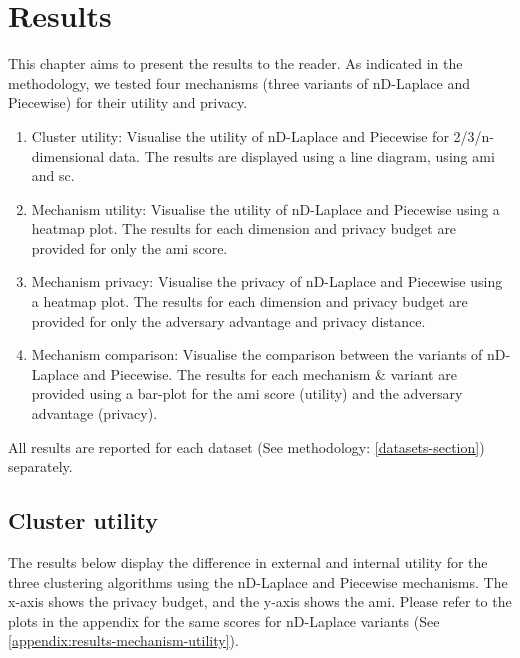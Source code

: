 \chapter{Results}
This chapter aims to present the results to the reader.
As indicated in the methodology, we tested four mechanisms (three variants of nD-Laplace and Piecewise) for their utility and privacy.
\begin{enumerate}
  \item Cluster utility: Visualise the utility of nD-Laplace and Piecewise for 2/3/n-dimensional data.
        The results are displayed using a line diagram, using \gls{ami} and \gls{sc}.
  \item Mechanism utility: Visualise the utility of nD-Laplace and Piecewise using a heatmap plot.
        The results for each dimension and privacy budget are provided for only the \gls{ami} score.
  \item Mechanism privacy: Visualise the privacy of nD-Laplace and Piecewise using a heatmap plot.
        The results for each dimension and privacy budget are provided for only the adversary advantage and privacy distance.
  \item Mechanism comparison: Visualise the comparison between the variants of nD-Laplace and Piecewise.
        The results for each mechanism \& variant are provided using a bar-plot for the \gls{ami} score (utility) and the adversary advantage (privacy).
\end{enumerate}
All results are reported for each dataset (See methodology: \ref{datasets-section}) separately.
\section{Cluster utility}
The results below display the difference in external and internal utility for the three clustering algorithms using the nD-Laplace and Piecewise mechanisms.
The x-axis shows the privacy budget, and the y-axis shows the \gls{ami}.
Please refer to the plots in the appendix for the same scores for nD-Laplace variants (See \ref{appendix:results-mechanism-utility}).
\newpage
